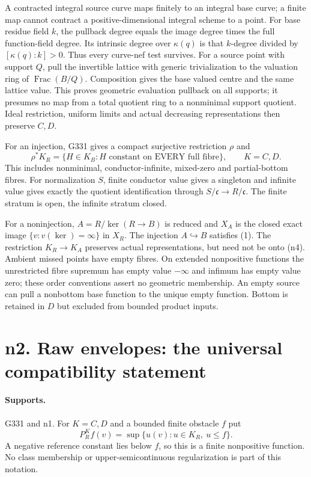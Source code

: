 A contracted integral source curve maps finitely to an integral base curve; a finite map cannot contract a positive-dimensional integral scheme to a point. For base residue field $k$, the pullback degree equals the image degree times the full function-field degree. Its intrinsic degree over $\kappa(q)$ is that $k$-degree divided by $[\kappa(q):k]>0$. Thus every curve-nef test survives. For a source point with support $Q$, pull the invertible lattice with generic trivialization to the valuation ring of $\operatorname{Frac}(B/Q)$. Composition gives the base valued centre and the same lattice value. This proves geometric evaluation pullback on all supports; it presumes no map from a total quotient ring to a nonminimal support quotient. Ideal restriction, uniform limits and actual decreasing representations then preserve $C,D$.

For an injection, G331 gives a compact surjective restriction $\rho$ and
\[
 \rho^*K_R=\{H\in K_B:H\text{ constant on EVERY full fibre}\},\qquad K=C,D. \tag{1}
\]
This includes nonminimal, conductor-infinite, mixed-zero and partial-bottom fibres. For normalization $S$, finite conductor value gives a singleton and infinite value gives exactly the quotient identification through $S/\mathfrak c\to R/\mathfrak c$. The finite stratum is open, the infinite stratum closed.

For a noninjection, $A=R/\ker(R\to B)$ is reduced and $X_A$ is the closed exact image $\{v:v(\ker)=\infty\}$ in $X_R$. The injection $A\hookrightarrow B$ satisfies (1). The restriction $K_R\to K_A$ preserves actual representations, but need not be onto (n4). Ambient missed points have empty fibres. On extended nonpositive functions the unrestricted fibre supremum has empty value $-\infty$ and infimum has empty value zero; these order conventions assert no geometric membership. An empty source can pull a nonbottom base function to the unique empty function. Bottom is retained in $D$ but excluded from bounded product inputs.


\section{n2. Raw envelopes: the universal compatibility statement}
\paragraph{Supports.} G331 and n1.
For $K=C,D$ and a bounded finite obstacle $f$ put
\[
 P_R^Kf(v)=\sup\{u(v):u\in K_R,\ u\le f\}.
\]
A negative reference constant lies below $f$, so this is a finite nonpositive function. No class membership or upper-semicontinuous regularization is part of this notation.

